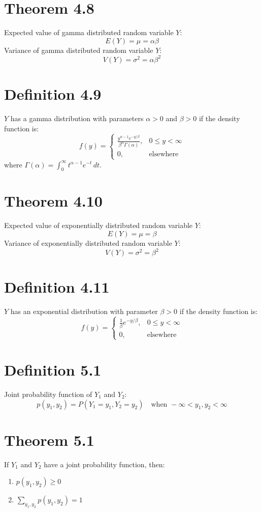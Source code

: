 \documentclass[12pt]{article}
\begin{document}
\section{Theorem 4.8}
Expected value of gamma distributed random variable $Y$:
\[
E(Y) = \mu = \alpha\beta
\]
Variance of gamma distributed random variable $Y$:
\[
V(Y) = \sigma^2 = \alpha\beta^2
\]

\section{Definition 4.9}
$Y$ has a gamma distribution with parameters $\alpha > 0$ and $\beta > 0$ if the density function is:
\[
f(y) = \begin{cases} \frac{y^{\alpha-1} e^{-y/\beta}}{\beta^\alpha \Gamma(\alpha)}, & 0 \leq y < \infty \\ 0, & \text{elsewhere} \end{cases}
\]
where $\Gamma(\alpha) = \int_0^{\infty} t^{\alpha-1} e^{-t}\,dt$.

\section{Theorem 4.10}
Expected value of exponentially distributed random variable $Y$:
\[
E(Y) = \mu = \beta
\]
Variance of exponentially distributed random variable $Y$:
\[
V(Y) = \sigma^2 = \beta^2
\]

\section{Definition 4.11}
$Y$ has an exponential distribution with parameter $\beta > 0$ if the density function is:
\[
f(y) = \begin{cases} \frac{1}{\beta} e^{-y/\beta}, & 0 \leq y < \infty \\ 0, & \text{elsewhere} \end{cases}
\]


\section{Definition 5.1}
Joint probability function of $Y_1$ and $Y_2$:
\[
p(y_1, y_2) = P(Y_1 = y_1, Y_2 = y_2) \quad \text{when } -\infty < y_1, y_2 < \infty
\]

\section{Theorem 5.1}
If $Y_1$ and $Y_2$ have a joint probability function, then:
\begin{enumerate}
  \item $p(y_1, y_2) \geq 0$
  \item $\sum_{y_1, y_2} p(y_1, y_2) = 1$
\end{enumerate}
\end{document}
